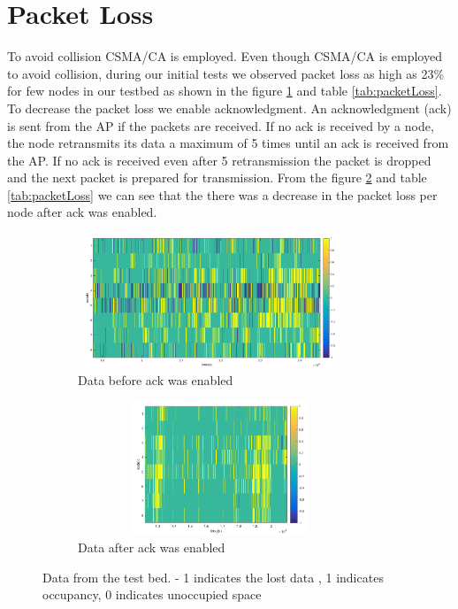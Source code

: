 \section{Packet Loss}
To avoid collision CSMA/CA is employed. Even though CSMA/CA is employed to avoid collision, during our initial tests we observed packet loss as high as 23\% for few nodes in our testbed as shown in the figure \ref{fig:ackDis} and table \ref{tab:packetLoss}. To decrease the packet loss we enable acknowledgment. An acknowledgment (ack) is sent from the AP if the packets are received. If no ack is received by a node, the node retransmits its data a maximum of 5 times until an ack is  received from the AP. If no ack is received even after 5 retransmission the packet is dropped and the next packet is prepared for transmission. From the figure \ref{fig:ackEnb} and table \ref{tab:packetLoss} we can see that the there was a decrease in the packet loss per node after ack was enabled. 

\begin{figure}[!ht]
    \centering
    \begin{subfigure}[b]{1\textwidth}
        \centering
        \includegraphics[width=8cm,height=4cm]{./pics/packetLoss.png}
      \caption{Data before ack was enabled}
       \label{fig:ackDis}
    \end{subfigure}
    \hfill
    \begin{subfigure}[b]{1\textwidth}
        \centering
        \includegraphics[width=8.5cm,height=4cm]{./pics/dataAfterAck.png}
        \caption{Data after ack was enabled}
        \label{fig:ackEnb}
    \end{subfigure}
\caption{Data from the test bed. - 1 indicates the lost data , 1 indicates occupancy, 0 indicates unoccupied space}
\label{fig:packetLoss}
\end{figure}

